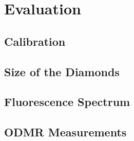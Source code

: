 \section{Evaluation}
\subsection{Calibration}

\subsection{Size of the Diamonds}

\subsection{Fluorescence Spectrum}

\subsection{ODMR Measurements}